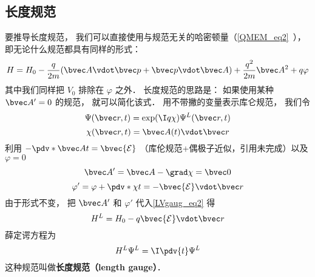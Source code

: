 \subsection{长度规范}
要推导长度规范， 我们可以直接使用与规范无关的哈密顿量（\autoref{QMEM_eq2}~）， 即无论什么规范都具有同样的形式：
\begin{equation}\label{LVgaug_eq2}
H = H_0 - \frac{q}{2m} (\bvec A \vdot \bvec p + \bvec p \vdot \bvec A)
+ \frac{q^2}{2m} \bvec A^2 + q \varphi
\end{equation}
其中我们同样把 $V_0$ 排除在 $\varphi$ 之外． 长度规范的思路是： 如果使用某种 $\bvec A' = 0$ 的规范， 就可以简化该式． 用不带撇的变量表示库仑规范， 我们令
\begin{equation}
\Psi(\bvec r, t) = \exp(\I q\chi)\Psi^L(\bvec r, t)
\end{equation}
\begin{equation}
\chi(\bvec r, t) = \bvec A(t) \vdot \bvec r
\end{equation}
利用 $-\pdv*{\bvec A}{t} = \bvec {\mathcal E}$ （库伦规范+偶极子近似，引用未完成）以及 $\varphi = 0$
\begin{equation}
\bvec A' = \bvec A - \grad \chi = \bvec 0
\end{equation}
\begin{equation}
\varphi' = \varphi + \pdv*{\chi}{t} = -\bvec {\mathcal E} \vdot \bvec r
\end{equation}
由于形式不变， 把 $\bvec A'$ 和 $\varphi'$ 代入\autoref{LVgaug_eq2} 得
\begin{equation}
H^L = H_0 - q\bvec{\mathcal{E}} \vdot \bvec r
\end{equation}
薛定谔方程为
\begin{equation}
H^L \Psi^L = \I \pdv{t} \Psi^L
\end{equation}
这种规范叫做\textbf{长度规范（length gauge）}．
